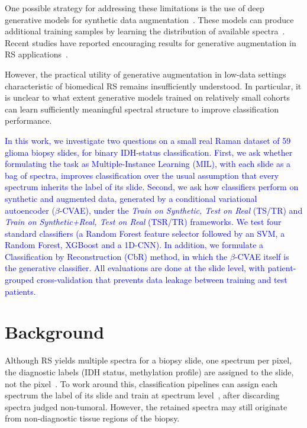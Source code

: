 \documentclass[12pt]{article}
\theoremstyle{paper}
\begin{document}
One possible strategy for addressing these limitations is the use of deep generative models for synthetic data augmentation~\cite{jordon2022synthetic}. These models can produce additional training samples by learning the distribution of available spectra~\cite{waseem2025review}. Recent studies have reported encouraging results for generative augmentation in RS applications~\cite{zhao2024raman}.

However, the practical utility of generative augmentation in low-data settings characteristic of biomedical RS remains insufficiently understood. In particular, it is unclear to what extent generative models trained on relatively small cohorts can learn sufficiently meaningful spectral structure to improve classification performance.

\textcolor{blue}{In this work, we investigate two questions on a small real Raman dataset of 59 glioma biopsy slides, for binary IDH-status classification. First, we ask whether formulating the task as Multiple-Instance Learning (MIL), with each slide as a bag of spectra, improves classification over the usual assumption that every spectrum inherits the label of its slide. Second, we ask how classifiers perform on synthetic and augmented data, generated by a conditional variational autoencoder ($\beta$-CVAE), under the \textit{Train on Synthetic, Test on Real} (TS/TR) and\textit{ Train on Synthetic+Real, Test on Real} (TSR/TR) frameworks. We test four standard classifiers (a Random Forest feature selector followed by an SVM, a Random Forest, XGBoost and a 1D-CNN). In addition, we formulate a Classification by Reconstruction (CbR) method, in which the $\beta$-CVAE itself is the generative classifier. All evaluations are done at the slide level, with patient-grouped cross-validation that prevents data leakage between training and test patients.}

\section{Background}
\label{sec:background}

Although RS yields multiple spectra for a biopsy slide, one spectrum per pixel, the diagnostic labels (IDH status, methylation profile) are assigned to the slide, not the pixel~\cite{stupak2025raman}. To work around this, classification pipelines can assign each spectrum the label of its slide and train at spectrum level~\cite{apollonov2024raman}, after discarding spectra judged non-tumoral. However, the retained spectra may still originate from non-diagnostic tissue regions of the biopsy.
\end{document}
